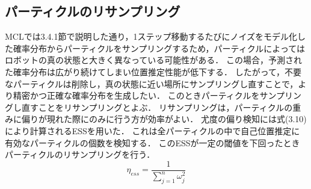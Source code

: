 \subsection{パーティクルのリサンプリング}
MCLでは3.4.1節で説明した通り，1ステップ移動するたびにノイズをモデル化した確率分布からパーティクルをサンプリングするため，パーティクルによってはロボットの真の状態と大きく異なっている可能性がある．
この場合，予測された確率分布は広がり続けてしまい位置推定性能が低下する．
したがって，不要なパーティクルは削除し，真の状態に近い場所にサンプリングし直すことで，より精密かつ正確な確率分布を生成したい．
このときパーティクルをサンプリングし直すことをリサンプリングとよぶ．
リサンプリングは，パーティクルの重みに偏りが現れた際にのみに行う方が効率がよい．
尤度の偏り検知には式(3.10)により計算されるESSを用いた．
これは全パーティクルの中で自己位置推定に有効なパーティクルの個数を検知する．
このESSが一定の閾値を下回ったときパーティクルのリサンプリングを行う．
\begin{equation}
 \displaystyle \eta _{ess} =\frac{1}{\sum _{j=1}^{n} \omega _{j}^{2}}   
\end{equation}
